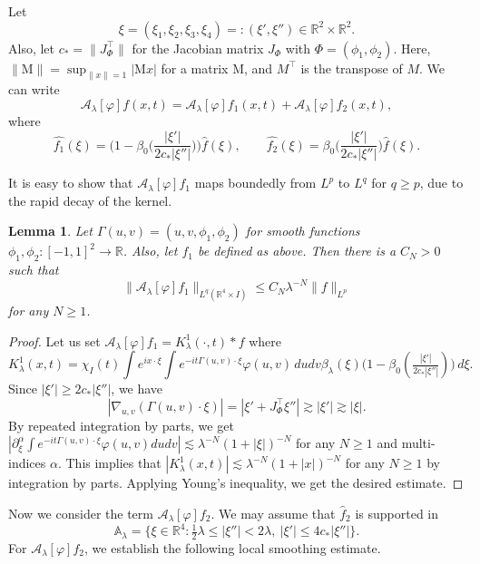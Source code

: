 \documentclass[10pt] %
{amsart}
\theoremstyle{plain}
\newtheorem{lem}[thm]{Lemma}
\numberwithin{equation}{section}
\newcommand{\R}{\mathbb R}
\begin{document}
Let   
\[
\xi=(\xi_1,\xi_2, \xi_3,\xi_4)=: (\xi',\xi'') \in \mathbb R^2\times \mathbb R^2.
\] 
Also, let $c_* =  \| J_\Phi^\intercal \|$   for the Jacobian matrix $J_\Phi$ with $\Phi = (\phi_1,\phi_2)$. Here, $\|\mathrm M\|=\sup_{\|x\|=1}\big| \mathrm Mx\big|$ for a matrix $\mathrm M$, and $M^\intercal $ is the transpose of $M$.
We can write
\[ 
\mathcal A_\lambda[\varphi]f(x,t) = \mathcal A_\lambda[\varphi]f_1(x,t) +\mathcal A_\lambda[\varphi]f_2(x,t) ,
\]
where 
\[ 
\widehat{f_1}(\xi) = \Big(1- \beta_0 \big(\frac{|\xi'|}{2c_*|\xi''|}\big)\Big)\widehat f(\xi) , \qquad   \widehat{f_2}(\xi) = \beta_0 \big(\frac{|\xi'|}{2c_*|\xi''|}\big) \widehat f(\xi).
\] 

It is easy to show that $\mathcal A_\lambda[\varphi]f_1$ maps boundedly from $L^p$ to $L^q$ for $q \ge p$, due to the rapid decay of the kernel.
\begin{lem}\label{lem:fast_dec}
Let $\Gamma(u,v)=(u,v,\phi_1,\phi_2)$ for smooth functions $\phi_1,\phi_2: [-1,1]^2 \rightarrow \R$. 
Also, let $f_1$ be defined as above. Then there is a $C_N>0$ such that
\[
\| \mathcal A_\lambda[\varphi]f_1\|_{L^q(\mathbb R^4\times I)} \le C_N\lambda^{-N} \|f\|_{L^p}
\]
for any $N\ge 1$.
\end{lem}
\begin{proof}
Let us set $\mathcal A_\lambda [\varphi]f_1=K^1_\lambda(\cdot,t)\ast f $ where 
\[
K^1_\lambda (x,t) =  \chi_I(t) \int e^{i  x\cdot \xi} \int e^{  - i  t\Gamma(u,v) \cdot \xi} \varphi(u,v)\,dudv \beta_\lambda( \xi) \big(1- \beta_0( \tfrac{|\xi'|}{2c_*|\xi''|})\big)\,d\xi.
\] 
Since $|\xi'|\ge 2c_*|\xi''|$, 
we have
\[ |\nabla_{u,v}(\Gamma(u,v)\cdot\xi)| = |\xi' + J_\Phi^\intercal
 \xi''| \gtrsim |\xi' |\gtrsim |\xi|. \] 
By repeated integration by parts, we get $|\partial_{\xi}^\alpha\int e^{-it\Gamma(u,v)\cdot\xi }\varphi(u,v) dudv|\lesssim \lambda^{-N}(1+|\xi|)^{-N}$ for any $N\ge1$ and multi-indices $\alpha$.  
This implies that $|K_\lambda^1(x,t)|\lesssim \lambda^{-N} (1+|x|)^{-N}$ for any $N\ge1$ by integration by parts. Applying Young's inequality, we get the desired estimate.
\end{proof}




Now we consider the term $\mathcal A_\lambda [\varphi]f_2$.
We may assume that $\widehat f_2$ is supported in  
\[ 
\mathbb A_\lambda=\{\xi\in \R^4:  \tfrac 12 \lambda  \le |\xi''| < 2\lambda, ~ |\xi'| \le 4 c_*|\xi''|\}.
\]
For $\mathcal A_\lambda[\varphi] f_2$, we establish the following local smoothing estimate.  
 
\end{document}
